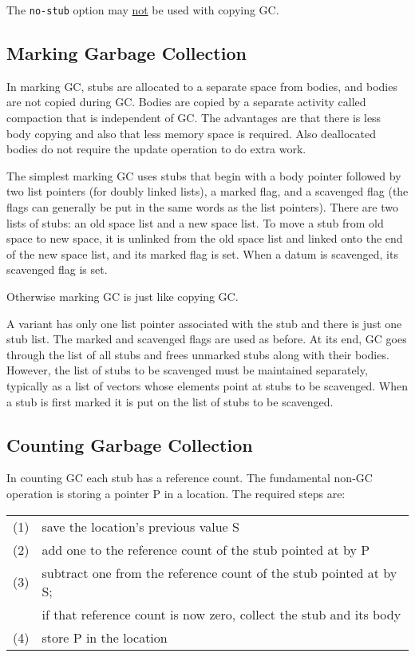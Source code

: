 \documentclass[12pt]{article}
\begin{document}
The {\tt no-stub} option may \underline{not} be used with
copying GC.

\subsection{Marking Garbage Collection}

In marking GC, stubs are allocated to a separate space
from bodies, and bodies are not copied during GC.
Bodies are copied by a separate activity called
compaction that is independent of GC.  The advantages
are that there is less body copying and also that less memory
space is required.  Also deallocated bodies do not
require the update operation to do extra work.

The simplest marking GC uses stubs that begin with
a body pointer followed by two list pointers (for doubly linked lists),
a marked flag, and a scavenged flag (the flags can generally
be put in the same words as the list pointers).  There are two lists
of stubs: an old space list and a new space
list.  To move a stub from old space to new space,
it is unlinked from the old space list and linked
onto the end of the new space list, and its marked
flag is set.  When a datum is scavenged, its scavenged
flag is set.

Otherwise marking GC is just like copying GC.

A variant has only one list pointer associated with
the stub and there is just one stub list.  The
marked and scavenged flags are used as before.
At its end, GC goes through the list of all stubs
and frees unmarked stubs along with their bodies.
However, the list of stubs to be scavenged must
be maintained separately, typically as a list of
vectors whose elements point at stubs to be scavenged.
When a stub is first marked it is put on the list
of stubs to be scavenged.

\subsection{Counting Garbage Collection}

In counting GC each stub has a reference
count.  The fundamental non-GC operation is storing
a pointer P in a location.  The required steps are:
\begin{center}
\begin{tabular}{rl}
(1) & save the location's previous value S \\
(2) & add one to the reference count of the stub pointed at by P \\
(3) & subtract one from the reference count of the stub pointed at by S; \\
    & if that reference count is now zero, collect the stub and its body \\
(4) & store P in the location
\end{tabular}
\end{center}
\end{document}
